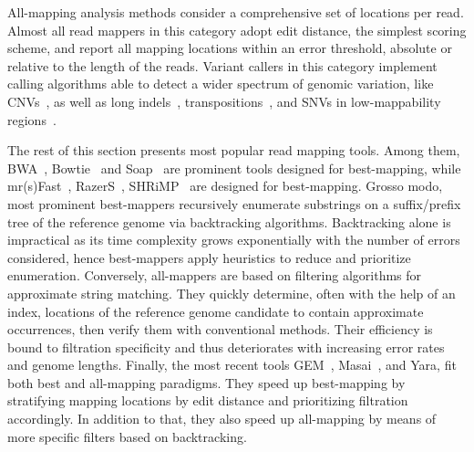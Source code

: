 All-mapping analysis methods consider a comprehensive set of locations per read.
Almost all read mappers in this category adopt edit distance, the simplest scoring scheme, and report all mapping locations within an error threshold, absolute or relative \wrt to the length of the reads.
Variant callers in this category implement calling algorithms able to detect a wider spectrum of genomic variation, like CNVs~\citep{mrCaNaVaR}, as well as long indels~\citep{SPLITREAD}, transpositions~\citep{VariationHunter}, and SNVs in low-mappability regions~\citep{Sniper}.

The rest of this section presents most popular read mapping tools.
Among them, BWA~\citep{bwa,bwa-sw}, Bowtie~\citep{bowtie,bowtie2} and Soap~\citep{soap} are prominent tools designed for best-mapping, while mr(s)Fast~\citep{mrfast,mrsfast}, RazerS~\citep{razers,razers3}, SHRiMP~\citep{razers,razers3} are designed for best-mapping.
Grosso modo, most prominent best-mappers recursively enumerate substrings on a suffix/prefix tree of the reference genome via backtracking algorithms.
Backtracking alone is impractical as its time complexity grows exponentially with the number of errors considered, hence best-mappers apply heuristics to reduce and prioritize enumeration.
Conversely, all-mappers are based on filtering algorithms for approximate string matching.
They quickly determine, often with the help of an index, locations of the reference genome candidate to contain approximate occurrences, then verify them with conventional methods.
Their efficiency is bound to filtration specificity and thus deteriorates with increasing error rates and genome lengths.
Finally, the most recent tools GEM~\citep{gem}, Masai~\citep{Siragusa2013}, and Yara, fit both best and all-mapping paradigms.
They speed up best-mapping by stratifying mapping locations by edit distance and prioritizing filtration accordingly.
In addition to that, they also speed up all-mapping by means of more specific filters based on backtracking.


